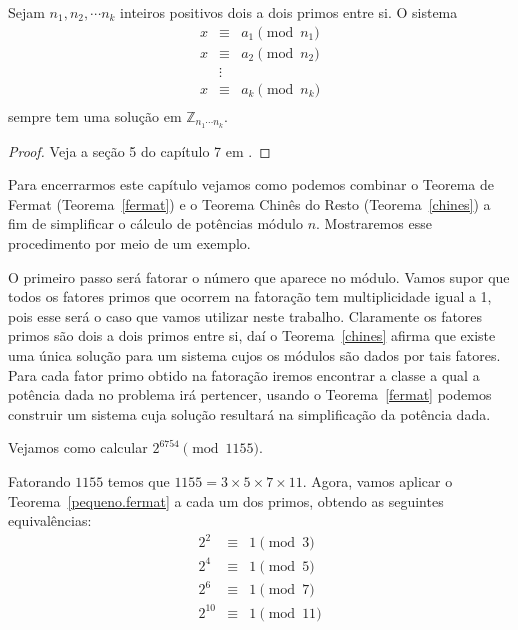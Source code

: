 \begin{Th}\label{chines}
Sejam $n_1, n_2, \cdots n_k$ inteiros positivos dois a dois primos entre si. O sistema
\[
\begin{array}{ccc}
 x & \equiv & a_1 \pmod{n_1}\\ 
 x & \equiv & a_2 \pmod{n_2} \\
   & \vdots &   \\
x & \equiv & a_k \pmod{n_k} \\	
\end{array}
\]
sempre tem uma solu\c{c}\~ao em $\mathbb{Z}_{n_1\cdots n_k}$.
\end{Th}
\begin{proof}
  Veja a se\c{c}\~{a}o 5 do cap\'{i}tulo 7 em \cite{cou:2014}.  
\end{proof}

Para encerrarmos este cap\'itulo vejamos como podemos combinar o Teorema de Fermat (Teorema~\ref{fermat}) 
e o Teorema Chin\^es do Resto (Teorema~\ref{chines}) a fim de simplificar o c\'{a}lculo de pot\^{e}ncias 
m\'{o}dulo $n$. Mostraremos esse procedimento por meio de um exemplo.


O primeiro passo ser\'{a} fatorar o n\'{u}mero que aparece no m\'{o}dulo. Vamos supor que 
todos os fatores primos que ocorrem na fatora\c{c}\~{a}o tem multiplicidade igual a 1, pois esse ser\'{a} o 
caso que vamos utilizar neste trabalho. Claramente os fatores primos s\~{a}o dois a dois primos entre si,
da\'{i} o Teorema~\ref{chines} afirma que existe uma \'{u}nica solu\c{c}\~{a}o para um sistema 
cujos os m\'{o}dulos s\~{a}o dados por tais fatores. Para cada fator primo obtido na fatora\c{c}\~{a}o iremos encontrar a 
classe a qual a pot\^{e}ncia dada no problema irá pertencer, usando o Teorema~\ref{fermat} podemos construir um 
sistema cuja solu\c{c}\~{a}o resultar\'{a} na simplifica\c{c}\~{a}o da pot\^{e}ncia dada. 

Vejamos como calcular $2^{6754} \pmod{1155}$. 					

Fatorando $1155$ temos que $1155= 3 \times 5 \times 7 \times 11$. Agora, vamos aplicar o Teorema~\ref{pequeno.fermat} 
a cada um dos primos, obtendo as seguintes equival\^{e}ncias:
\[
\begin{array}{ccl}
 2^2    & \equiv & 1 \pmod{3}\\
 2^4    & \equiv & 1 \pmod{5}\\ 
 2^6    & \equiv & 1 \pmod{7}\\  
 2^{10} & \equiv & 1 \pmod{11}\\
\end{array}
\]

